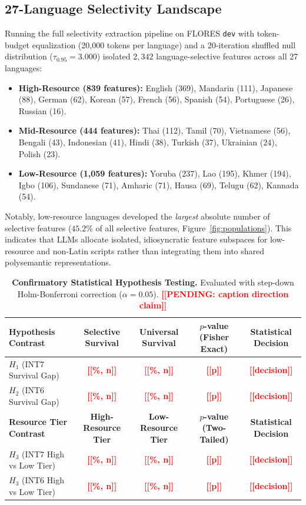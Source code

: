 \documentclass[11pt]{article}
\newcommand{\TODO}[1]{\textbf{\textcolor{red}{[[#1]]}}}
\begin{document}
\subsection{27-Language Selectivity Landscape}
Running the full selectivity extraction pipeline on FLORES \texttt{dev} with token-budget equalization (20,000 tokens per language) and a 20-iteration shuffled null distribution ($\tau_{0.95} = 3.000$) isolated $2,342$ language-selective features across all 27 languages:
\begin{itemize}
    \item \textbf{High-Resource (839 features):} English (369), Mandarin (111), Japanese (88), German (62), Korean (57), French (56), Spanish (54), Portuguese (26), Russian (16).
    \item \textbf{Mid-Resource (444 features):} Thai (112), Tamil (70), Vietnamese (56), Bengali (43), Indonesian (41), Hindi (38), Turkish (37), Ukrainian (24), Polish (23).
    \item \textbf{Low-Resource (1,059 features):} Yoruba (237), Lao (195), Khmer (194), Igbo (106), Sundanese (71), Amharic (71), Hausa (69), Telugu (62), Kannada (54).
\end{itemize}
Notably, low-resource languages developed the \emph{largest} absolute number of selective features ($45.2\%$ of all selective features, Figure~\ref{fig:populations}). This indicates that LLMs allocate isolated, idiosyncratic feature subspaces for low-resource and non-Latin scripts rather than integrating them into shared polysemantic representations.

\begin{table}[t]
\centering
\small
\begin{tabular*}{\textwidth}{@{\extracolsep{\fill}}lcccc@{}}
\toprule
\textbf{Hypothesis Contrast} & \textbf{Selective Survival} & \textbf{Universal Survival} & \textbf{$p$-value (Fisher Exact)} & \textbf{Statistical Decision} \\
\midrule
$H_1$ (INT7 Survival Gap) & \TODO{\%, n} & \TODO{\%, n} & \TODO{p} & \TODO{decision} \\
$H_2$ (INT6 Survival Gap) & \TODO{\%, n} & \TODO{\%, n} & \TODO{p} & \TODO{decision} \\
\midrule
\textbf{Resource Tier Contrast} & \textbf{High-Resource Tier} & \textbf{Low-Resource Tier} & \textbf{$p$-value (Two-Tailed)} & \textbf{Statistical Decision} \\
\midrule
$H_3$ (INT7 High vs Low Tier) & \TODO{\%, n} & \TODO{\%, n} & \TODO{p} & \TODO{decision} \\
$H_3$ (INT6 High vs Low Tier) & \TODO{\%, n} & \TODO{\%, n} & \TODO{p} & \TODO{decision} \\
\bottomrule
\end{tabular*}
\caption{\textbf{Confirmatory Statistical Hypothesis Testing.} Evaluated with step-down Holm-Bonferroni correction ($\alpha = 0.05$). \TODO{PENDING: caption direction claim}}
\label{tab:statistical_decisions}
\end{table}
\end{document}
